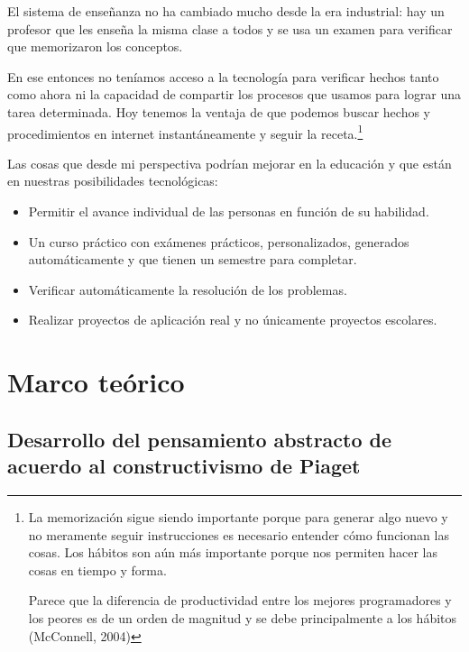 \documentclass[
  12,
]{scrartcl}
\begin{document}
El sistema de enseñanza no ha cambiado mucho desde la era industrial:
hay un profesor que les enseña la misma clase a todos y se usa un examen
para verificar que memorizaron los conceptos.

En ese entonces no teníamos acceso a la tecnología para verificar hechos
tanto como ahora ni la capacidad de compartir los procesos que usamos
para lograr una tarea determinada. Hoy tenemos la ventaja de que podemos
buscar hechos y procedimientos en internet instantáneamente y seguir la
receta.\footnote{La memorización sigue siendo importante porque para
  generar algo nuevo y no meramente seguir instrucciones es necesario
  entender cómo funcionan las cosas. Los hábitos son aún más importante
  porque nos permiten hacer las cosas en tiempo y forma.

  Parece que la diferencia de productividad entre los mejores
  programadores y los peores es de un orden de magnitud y se debe
  principalmente a los hábitos (McConnell, 2004)}

Las cosas que desde mi perspectiva podrían mejorar en la educación y que
están en nuestras posibilidades tecnológicas:

\begin{itemize}
\item
  Permitir el avance individual de las personas en función de su
  habilidad.
\item
  Un curso práctico con exámenes prácticos, personalizados, generados
  automáticamente y que tienen un semestre para completar.
\item
  Verificar automáticamente la resolución de los problemas.
\item
  Realizar proyectos de aplicación real y no únicamente proyectos
  escolares.
\end{itemize}

\hypertarget{marco-teuxf3rico}{%
\section{Marco teórico}\label{marco-teuxf3rico}}

\hypertarget{desarrollo-del-pensamiento-abstracto-de-acuerdo-al-constructivismo-de-piaget}{%
\subsection{Desarrollo del pensamiento abstracto de acuerdo al
constructivismo de
Piaget}\label{desarrollo-del-pensamiento-abstracto-de-acuerdo-al-constructivismo-de-piaget}}
\end{document}
